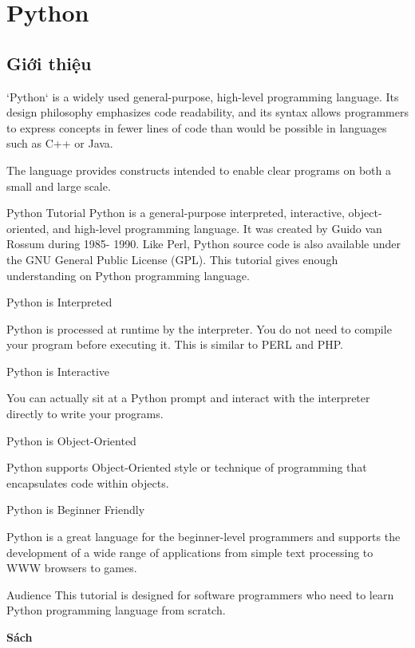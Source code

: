 \chapter{Python}

\section{Giới thiệu}

\begin{item}
  \item `Python` is a widely used general-purpose, high-level programming language. Its design philosophy emphasizes code readability, and its syntax allows programmers to express concepts in fewer lines of code than would be possible in languages such as C++ or Java.
  \item The language provides constructs intended to enable clear programs on both a small and large scale.
\end{item}

Python Tutorial
Python is a general-purpose interpreted, interactive, object-oriented, and high-level programming language. It was created by Guido van Rossum during 1985- 1990. Like Perl, Python source code is also available under the GNU General Public License (GPL). This tutorial gives enough understanding on Python programming language.

Python is Interpreted

Python is processed at runtime by the interpreter. You do not need to compile your program before executing it. This is similar to PERL and PHP.

Python is Interactive

You can actually sit at a Python prompt and interact with the interpreter directly to write your programs.

Python is Object-Oriented

Python supports Object-Oriented style or technique of programming that encapsulates code within objects.

Python is Beginner Friendly

Python is a great language for the beginner-level programmers and supports the development of a wide range of applications from simple text processing to WWW browsers to games.

Audience
This tutorial is designed for software programmers who need to learn Python programming language from scratch.


\textbf{Sách}

